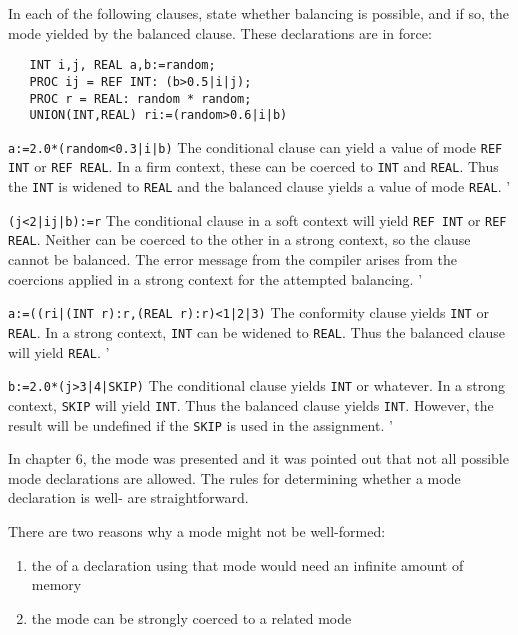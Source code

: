 \begin{exercise}
\item In each of the following clauses, state whether balancing is
possible, and if so, the mode yielded by the balanced clause. These
declarations are in force:
\begin{verbatim}
   INT i,j, REAL a,b:=random;
   PROC ij = REF INT: (b>0.5|i|j);
   PROC r = REAL: random * random;
   UNION(INT,REAL) ri:=(random>0.6|i|b)
\end{verbatim}
\indent\begin{subex}
\item \verb!a:=2.0*(random<0.3|i|b)! \subans The conditional clause
can yield a value of mode \verb|REF INT| or \texttt{REF REAL}. In a
firm context, these can be coerced to \verb|INT| and \verb|REAL|.
Thus the \verb|INT| is widened to \verb|REAL| and the balanced clause
yields a value of mode \verb|REAL|.
'
\item \verb!(j<2|ij|b):=r! \subans The conditional clause in a soft
context will yield \verb|REF INT| or \verb|REF REAL|. Neither can be
coerced to the other in a strong context, so the clause cannot be
balanced. The error message from the compiler arises from the
coercions applied in a strong context for the attempted balancing.
'
\item \verb!a:=((ri|(INT r):r,(REAL r):r)<1|2|3)! \subans The
conformity clause yields \verb|INT| or \verb|REAL|. In a strong
context, \verb|INT| can be widened to \verb|REAL|. Thus the balanced
clause will yield \verb|REAL|.
'
\item \verb!b:=2.0*(j>3|4|SKIP)! \subans The conditional clause
yields \verb|INT| or whatever. In a strong context, \verb|SKIP| will
yield \verb|INT|. Thus the balanced clause yields \verb|INT|.
However, the result will be undefined if the \verb|SKIP| is used in
the assignment.
'
\end{subex}
\end{exercise}

In chapter 6, the mode  was
presented and it was pointed out that not all possible mode
declarations are allowed.  The rules for determining whether a mode
declaration is well- are
straightforward.

There are two reasons why a mode might not be well-formed:
\begin{enumerate}
\item the  of a declaration using that
mode would need an infinite amount of memory
\item the mode can be strongly coerced to a related
mode\hypertarget{gram-well2}{}\label{gram-well2}
\end{enumerate}

